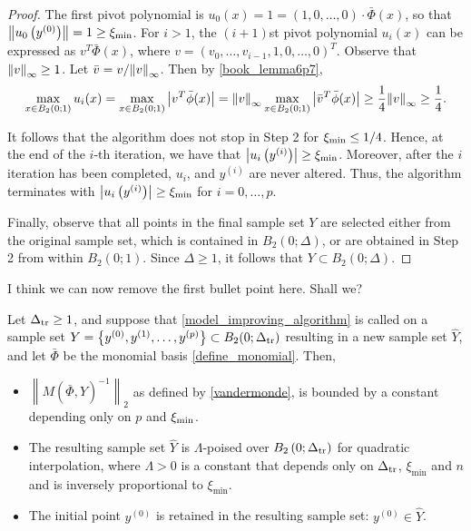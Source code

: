 \documentclass{article}
\begin{document}
\begin{proof}

The first pivot polynomial is $u_0(x) = 1 = (1, 0, \ldots, 0)\cdot \bar\Phi(x)$, so that $\left\|u_0\left(y^{(0)}\right)\right\| = 1 \ge \xi_{\text{min}}$.
For $i > 1$, the $(i+1)$st pivot polynomial $u_i(x)$ can be expressed as $v^T \bar{\Phi}(x)$,
where $v = (v_0, \ldots, v_{i-1},1,0,\ldots,0)^T$.
Observe that ${\left\|v\right\|}_{\infty} \ge 1$.
Let $\bar{v} = v/{\left\|v\right\|}_{\infty}$.
Then by \cref{book_lemma6p7},
\[ \max_{x \in B_2(0;1)} u_i(x) = \max_{x \in B_2(0;1)} \left| v^T \bar{\phi}(x)\right| =
{\left\|v\right\|}_{\infty} \max_{x \in B_2(0;1)}  \left|\bar{v}^T \bar{\phi}(x)\right| \ge \frac{1}{4} {\left\|v\right\|}_{\infty} \ge \frac{1}{4}.\]

It follows that the algorithm does not stop in Step 2 for $\xi_{\text{min}} \le 1/4$.   Hence, at the end of the $i$-th iteration, we have that  $\left| u_i\left(y^{(i)}\right)\right| \ge \xi_{\text{min}}$.  Moreover,  after the $i$ iteration has been completed,  $u_i$,  and $y^{(i)}$ are never altered.  Thus, the algorithm terminates with  $\left| u_i\left(y^{(i)}\right)\right| \ge \xi_{\text{min}}$ for $i=0, \ldots, p$.

Finally,  observe that all points in the final sample set $Y$ are selected either from the original sample set, which is contained in $B_2(0;\Delta)$,  or are obtained in Step 2 from within $B_2(0;1)$.  Since $\Delta  \ge 1$, it follows that $Y \subset B_2(0;\Delta)$.

\end{proof}


\color{magenta}
I think we can now remove the first bullet point here. Shall we?
\color{black}

\begin{theorem}
\label{set_is_poised}

Let $\Delta_{\textrm{tr}} \ge 1$, and suppose that \cref{model_improving_algorithm} is called on a sample set
$Y = \left\{y^{(0)}, y^{(1)}, \ldots, y^{(p)}\right\} \subset B_2(0; \Delta_{\textrm{tr}})$
resulting in a new sample set $\hat Y$,
and let $\bar{\Phi}$ be the monomial basis \cref{define_monomial}.
Then,
\begin{itemize}
\item $\left\|M(\bar \Phi, \hat Y)^{-1}\right\|_2$ as defined by \cref{vandermonde}, is bounded by a constant depending only on $p$ and $\xi_{\text{min}}$.
\item The resulting sample set $\hat Y$ is $\Lambda$-poised over $B_2\left(0;\Delta_{\textrm{tr}} \right)$ for quadratic interpolation,
where $\Lambda > 0$ is a constant that depends only on $\Delta_{\textrm{tr}}$, $\xi_{\text{min}}$ and $n$ and is inversely proportional to $\xi_{\text{min}}$.
\item The initial point $y^{(0)}$ is retained in the resulting sample set: $y^{(0)} \in \hat Y$.
\end{itemize}
\end{theorem}
\end{document}
